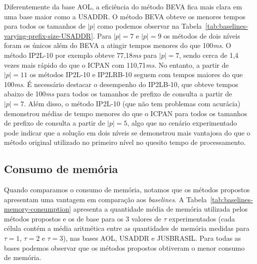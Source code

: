 Diferentemente da base AOL, a eficiência do método BEVA fica mais clara em uma base maior como a USADDR. O método BEVA obteve os menores tempos para todos os tamanhos de $|p|$ como podemos observar na Tabela~\ref{tab:baselines-varying-prefix-size-USADDR}. Para $|p|=7$ e $|p|=9$ os métodos de dois níveis foram os únicos além do BEVA a atingir tempos menores do que 100\textit{ms}. O método IP2L-10 por exemplo obteve 77,18\textit{ms} para $|p|=7$, sendo cerca de 1,4 vezes mais rápido do que o ICPAN com 110,71\textit{ms}. No entanto, a partir de $|p|=11$ os métodos IP2L-10 e IP2LRB-10 seguem com tempos maiores do que 100\textit{ms}. É necessário destacar o desempenho do IP2LB-10, que obteve tempos abaixo de 100\textit{ms} para todos os tamanhos de prefixo de consulta a partir de $|p|=7$. Além disso, o método IP2L-10 (que não tem problemas com acurácia) demonstrou médias de tempo menores do que o ICPAN para todos os tamanhos de prefixo de consulta a partir de $|p|=5$, algo que no cenário experimentado pode indicar que a solução em dois níveis se demonstrou mais vantajosa do que o método original utilizado no primeiro nível no quesito tempo de processamento.

\subsection{Consumo de memória}

Quando comparamos o consumo de memória, notamos que os métodos propostos apresentam uma vantagem em comparação aos \textit{baselines}. A Tabela~\ref{tab:baselines-memory-consumption} apresenta a quantidade média de memória utilizada pelos métodos propostos e os de base para os 3 valores de $\tau$ experimentados (cada célula contém a média aritmética entre as quantidades de memória medidas para $\tau=1$, $\tau=2$ e $\tau=3$), nas bases AOL, USADDR e JUSBRASIL. Para todas as bases podemos observar que os métodos propostos obtiveram o menor consumo de memória. 

